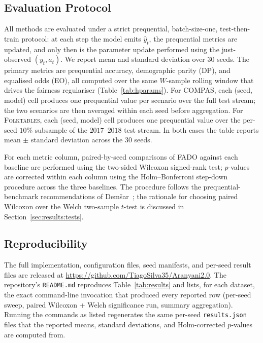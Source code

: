 \documentclass[sigconf,anonymous,review]{acmart}
\begin{document}
\subsection{Evaluation Protocol}
\label{sec:method:protocol}
All methods are evaluated under a strict prequential, batch-size-one, test-then-train protocol: at each step the model emits $\hat{y}_t$, the prequential metrics
are updated, and only then is the parameter update performed using the just-observed $(y_t, a_t)$. We report mean and standard deviation over $30$ seeds.
The primary metrics are prequential accuracy, demographic parity (DP), and equalised odds (EO), all computed over the same $W$-sample rolling window that drives
the fairness regulariser (Table~\ref{tab:hparams}). For \textsc{COMPAS}, each (seed, model) cell produces one prequential value per scenario over the full
test stream; the two scenarios are then averaged within each seed before aggregation. For \textsc{Folktables}, each (seed, model) cell produces one prequential
value over the per-seed $10\%$ subsample of the $2017$--$2018$ test stream. In both cases the table reports mean $\pm$ standard deviation across the $30$
seeds.

For each metric column, paired-by-seed comparisons of \textsc{FADO} against each baseline are performed using the two-sided Wilcoxon signed-rank test;
$p$-values are corrected within each column using the Holm--Bonferroni step-down procedure across the three baselines. The procedure follows the
prequential-benchmark recommendations of Dem{\v{s}}ar~\cite{demsar2006statistical}; the rationale for choosing paired Wilcoxon over the Welch
two-sample $t$-test is discussed in Section~\ref{sec:results:tests}.

\subsection{Reproducibility}
\label{sec:method:reproducibility}
The full implementation, configuration files, seed manifests, and per-seed result files are released at
\url{https://github.com/TiagoSilva35/Aranyani2.0}. The repository's \texttt{README.md} reproduces Table~\ref{tab:results} and lists, for each dataset, the
exact command-line invocation that produced every reported row (per-seed sweep, paired Wilcoxon + Welch significance run, summary aggregation). Running the
commands as listed regenerates the same per-seed \texttt{results.json} files that the reported means, standard deviations, and Holm-corrected $p$-values
are computed from.
\end{document}
